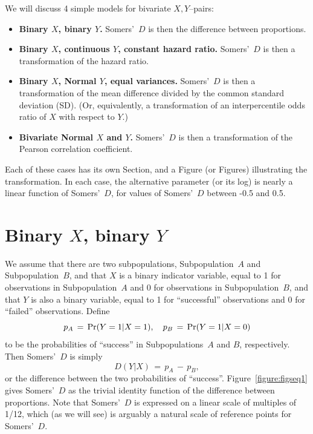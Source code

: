 \documentclass[a4paper,notitlepage]{article}      %
\begin{document}
We will discuss 4 simple models for bivariate $X,Y$--pairs:

\begin{itemize}

\item \textbf{Binary $X$, binary $Y$.} Somers'~$D$ is then the difference between proportions.

\item \textbf{Binary $X$, continuous $Y$, constant hazard ratio.} Somers'~$D$ is then a transformation of the hazard ratio.

\item \textbf{Binary $X$, Normal $Y$, equal variances.}
Somers'~$D$ is then a transformation of the mean difference divided by the common standard deviation (SD).
(Or, equivalently, a transformation of an interpercentile odds ratio of $X$ with respect to $Y$.)

\item \textbf{Bivariate Normal $X$ and $Y$.} Somers'~$D$ is then a transformation of the Pearson correlation coefficient.

\end{itemize}

Each of these cases has its own Section, and a Figure (or Figures) illustrating the transformation.
In each case, the alternative parameter (or its log) is nearly a linear function of Somers'~$D$,
for values of Somers'~$D$ between -0.5 and 0.5.

\section{Binary $X$, binary $Y$}

We assume that there are two subpopulations, Subpopulation~$A$ and Subpopulation~$B$, and that $X$ is a binary indicator variable,
equal to 1 for observations in Subpopulation~$A$ and 0 for observations in Subpopulation~$B$,
and that $Y$ is also a binary variable, equal to 1 for ``successful'' observations and 0 for ``failed'' observations.
Define
\def\Pr{{\rm Pr}}
\begin{equation}
p_A \, = \, \Pr(Y=1|X=1), \quad p_B \, = \, \Pr(Y=1|X=0)
\label{equation:eqseq17}
\end{equation}
to be the probabilities of ``success'' in Subpopulations~$A$ and $B$, respectively. Then Somers'~$D$ is simply
\begin{equation}
D(Y|X) \, = \, p_A \, - \, p_B ,
\label{equation:eqseq18}
\end{equation}
or the difference between the two probabilities of ``success''.
Figure~\ref{figure:figseq1} gives Somers'~$D$ as the trivial identity function of the difference between proportions.
Note that Somers'~$D$ is expressed on a linear scale of multiples of 1/12,
which (as we will see) is arguably a natural scale of reference points for Somers'~$D$.
\end{document}

